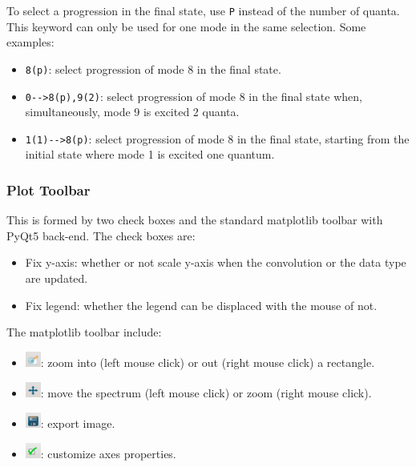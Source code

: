 \documentclass[a4paper,11pt]{article}
\begin{document}
To select a progression in the final state, use \texttt{P} instead of the number of quanta. This keyword can only be used for one mode in the same selection. Some examples:

\begin{itemize}
 \item \texttt{8(p)}: select progression of mode 8 in the final state.
 \item \texttt{0{-}{-}>8(p),9(2)}: select progression of mode 8 in the final state when, simultaneously, mode 9 is excited 2 quanta.
 \item \texttt{1(1){-}{-}>8(p)}: select progression of mode 8 in the final state, starting from the initial state where mode 1 is excited one quantum.
\end{itemize}

\subsubsection{Plot Toolbar}
This is formed by two check boxes and the standard matplotlib toolbar with PyQt5 back-end. The check boxes are:
\begin{itemize}
 \item Fix y-axis: whether or not scale y-axis when the convolution or the data type are updated.
 \item Fix legend: whether the legend can be displaced with the mouse of not.
\end{itemize}

The matplotlib toolbar include:
\begin{itemize}
 \item \includegraphics[width=0.5cm]{figs/butt_zoom.jpg}: zoom into (left mouse click) or out (right mouse click) a rectangle.
 \item \includegraphics[width=0.5cm]{figs/butt_move.jpg}: move the spectrum (left mouse click) or zoom (right mouse click).
 \item \includegraphics[width=0.5cm]{figs/butt_save.jpg}: export image.
 \item \includegraphics[width=0.5cm]{figs/butt_edit.jpg}: customize axes properties.
\end{itemize}
\end{document}
